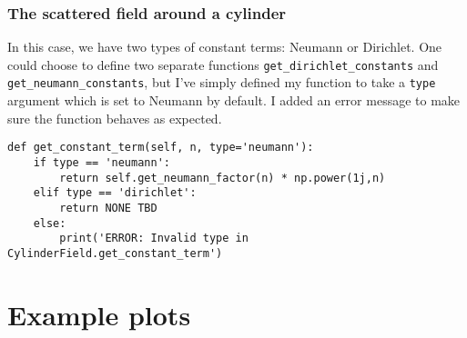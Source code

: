 \subsubsection{The scattered field around a cylinder}
%
In this case, we have two types of constant terms: Neumann or Dirichlet. One could choose to define two separate functions \verb!get_dirichlet_constants! and \verb!get_neumann_constants!, but I've simply defined my function to take a \verb!type! argument which is set to Neumann by default. I added an error message to make sure the function behaves as expected.
%
\begin{lstlisting}
def get_constant_term(self, n, type='neumann'):
    if type == 'neumann':
        return self.get_neumann_factor(n) * np.power(1j,n)
    elif type == 'dirichlet':
        return NONE TBD
    else:
        print('ERROR: Invalid type in CylinderField.get_constant_term')

\end{lstlisting}


\section{Example plots}
